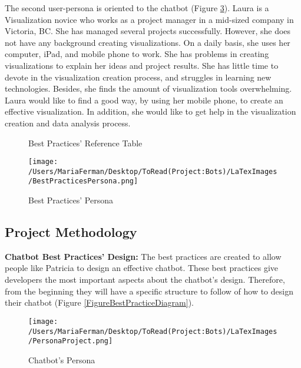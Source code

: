 \documentclass[a4paper,10pt]{article}
\begin{document}
The second user-persona is oriented to the chatbot (Figure \ref{FigureLaura}). Laura is a Visualization novice who works as a project manager in a mid-sized company in Victoria, BC. She has managed several projects successfully. However, she does not have any background creating visualizations. On a daily basis, she uses her computer, iPad, and mobile phone to work. She has problems in creating visualizations to explain her ideas and project results. She has little time to devote in the visualization creation process, and struggles in learning new technologies. Besides, she finds the amount of visualization tools overwhelming. Laura would like to find a good way, by using her mobile phone, to create an effective visualization. In addition, she would like to get help in the visualization creation and data analysis process.  


\begin{landscape}
\begin{figure}[p]
\thispagestyle{empty}
\vfill
    \caption{Best Practices' Reference Table}
\begin{center}    
    {\thepage}
\end{center}
    \label{FigureReferencetable}
\end{figure}
\end{landscape}

\begin{figure}
\centering
\texttt{[image: /Users/MariaFerman/Desktop/ToRead(Project:Bots)/LaTexImages/BestPracticesPersona.png]}
\caption{Best Practices' Persona}
\label{FigurePatricia}
\end{figure}

\subsection*{Project Methodology}

\textbf{Chatbot Best Practices' Design:} The best practices are created to allow people like Patricia to design an effective chatbot. These best practices give developers the most important aspects about the chatbot's design. Therefore, from the beginning they will have a specific structure to follow of how to design their chatbot (Figure \ref{FigureBestPracticeDiagram}). 

\begin{figure}
\centering
\texttt{[image: /Users/MariaFerman/Desktop/ToRead(Project:Bots)/LaTexImages/PersonaProject.png]}
\caption{Chatbot's Persona}
\label{FigureLaura}
\end{figure}
\end{document}
